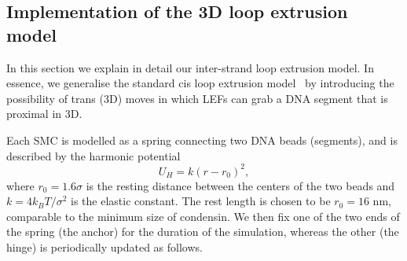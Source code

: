 \documentclass[aps,prl,twocolumn,a4paper,10pt,notitlepage,footinbib,nobalancelastpage,superscriptaddress,showpacs,floatfix]{revtex4-1}%
\begin{document}
\subsection{Implementation of the 3D loop extrusion model}
In this section we explain in detail our inter-strand loop extrusion model. In essence, we generalise the standard cis loop extrusion model~\cite{Fudenberg2016,Goloborodko2016a} by introducing the possibility of trans (3D) moves in which LEFs can grab a DNA segment that is proximal in 3D. 

Each SMC is modelled as a spring connecting two DNA beads (segments), and is described by the harmonic potential
\begin{equation}
\label{harmonic}
U_{H}=k\left(r-r_0\right)^2,
\end{equation}
where $r_0 = 1.6 \sigma$ is the resting distance between the centers of the two beads and $k = 4 k_BT/\sigma^2$ is the elastic constant. The rest length is chosen to be $r_0 = 16$ nm, comparable to the minimum size of condensin. We then fix one of the two ends of the spring (the anchor) for the duration of the simulation, whereas the other (the hinge) is periodically updated as follows.  
\end{document}
